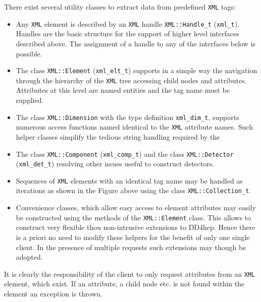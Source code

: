 There exist several utility classes to extract data from predefined \texttt{XML} tags:
\begin{itemize}
\item Any \texttt{XML} element is described by an \texttt{XML} handle \texttt{\texttt{XML::Handle\_t}} ({\texttt{xml\_t}}). Handles are the basic structure for the support of higher level interfaces described above. The assignment of a handle to any of the interfaces below is possible.
\item The class \texttt{\texttt{XML::Element}} ({\texttt{xml\_elt\_t}}) supports in a simple way the navigation through the hierarchy of the \texttt{XML} tree accessing child nodes and attributes. Attributes at this level are named entities and the tag name must be supplied.
\item The class \texttt{\texttt{XML::Dimension}} with the type definition {\texttt{xml\_dim\_t}}, supports numerous access functions named identical to the
\texttt{XML} attribute names. Such helper classes simplify the tedious string handling required by the 
\item The class \texttt{\texttt{XML::Component}} ({\texttt{xml\_comp\_t}}) and the class \texttt{\texttt{XML::Detector}} ({\texttt{xml\_det\_t}}) resolving other issues useful to construct detectors.
\item Sequences of \texttt{XML} elements with an identical tag name may be handled as iterations as shown in the Figure above using the class \texttt{\texttt{XML::Collection\_t}}.
\item Convenience classes, which allow easy access to element attributes  may easily be constructed using the methods of the {\texttt{XML::Element}} class. This allows to construct very flexible thou non-intrusive extensions to DD4hep. Hence there is a priori no need to modify these helpers for the benefit of only one single client. In the presence of multiple requests such extensions may though be adopted.
\end{itemize}
It is clearly the responsibility of the client to only request attributes from an \texttt{XML} element, which exist. If an attribute, a child node etc. is not found within the element an exception is thrown.

